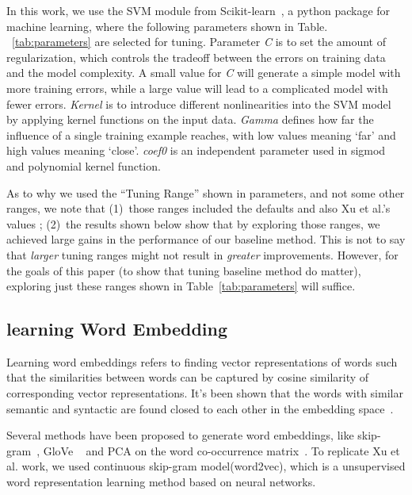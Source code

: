 \documentclass[sigconf,review, anonymous]{acmart}
\theoremstyle{break}
\newcommand{\tab}[1]{Table~\ref{tab:#1}}
\begin{document}
In this work, we use the SVM module from Scikit-learn~\cite{scikit-learn}, a python package for machine learning,
where the following parameters shown in Table. ~\ref{tab:parameters} are selected for tuning.
Parameter {\it C} is to set the amount of regularization, which controls the tradeoff between
the errors on training data and the model complexity.  A small value for {\it C} will generate 
a simple model with more training errors, while a large value will lead to a complicated model with fewer
errors. {\it Kernel} is to introduce different nonlinearities into the SVM model by applying kernel functions
on the input data. {\it Gamma } defines how far the influence of a single training example reaches, 
with low values meaning `far' and high values meaning `close'. {\it coef0} is an independent parameter used
in sigmod and  polynomial kernel function.

As to why we used the ``Tuning Range'' shown in {parameters}, and not some other ranges,
we note that (1)~those ranges included the defaults and also Xu et al.'s values ; (2)~the results shown below
show that by exploring those ranges,  we achieved large gains in the performance of our baseline method.
This is not to say that {\em larger} tuning ranges might not result in {\em greater} improvements.
However, for the goals of this paper (to show that tuning baseline method do matter), exploring
just these ranges shown in \tab{parameters} will suffice.




\subsection{learning Word Embedding}
Learning word embeddings refers to finding vector representations
of words such that the similarities between words can be captured by cosine similarity of corresponding 
vector representations. It's been shown that the words with similar semantic and syntactic are found closed
to each other in the embedding space~\cite{mikolov2013distributed}.

Several methods have been proposed to generate word embeddings, 
like skip-gram~\cite{mikolov2013distributed}, GloVe ~\cite{pennington2014glove}
and PCA on the word co-occurrence matrix~\cite{lebret2013word}. To replicate Xu et al. work,
we used continuous skip-gram model(word2vec),  which is a unsupervised word representation learning method based on
neural networks. 
\end{document}
